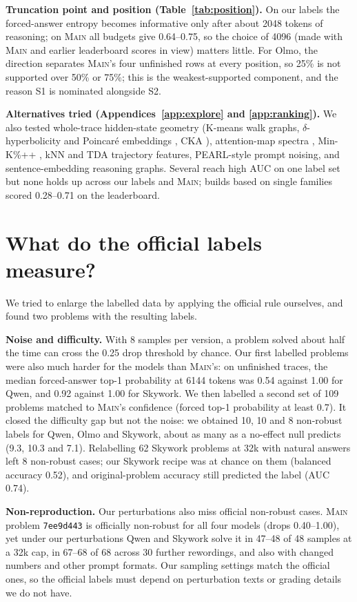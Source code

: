 \documentclass{article}
\newcommand{\sone}{\textsc{S1}}
\newcommand{\stwo}{\textsc{S2}}
\begin{document}
\textbf{Truncation point and position (Table~\ref{tab:position}).} On our labels the forced-answer entropy becomes informative only after about 2048 tokens of reasoning; on \textsc{Main} all budgets give 0.64--0.75, so the choice of 4096 (made with \textsc{Main} and earlier leaderboard scores in view) matters little. For Olmo, the direction separates \textsc{Main}'s four unfinished rows at every position, so 25\% is not supported over 50\% or 75\%; this is the weakest-supported component, and the reason \sone{} is nominated alongside \stwo{}.

\textbf{Alternatives tried (Appendices~\ref{app:explore} and \ref{app:ranking}).} We also tested whole-trace hidden-state geometry (K-means walk graphs, $\delta$-hyperbolicity and Poincar\'e embeddings \citep{raj2026hyperbolic}, CKA \citep{kornblith2019cka}), attention-map spectra \citep{binkowski2025lapeig}, Min-K\%++ \citep{zhang2025minkpp}, kNN and TDA trajectory features, PEARL-style prompt noising, and sentence-embedding reasoning graphs. Several reach high AUC on one label set but none holds up across our labels and \textsc{Main}; builds based on single families scored 0.28--0.71 on the leaderboard.

\section{What do the official labels measure?}
\label{sec:labels}
We tried to enlarge the labelled data by applying the official rule ourselves, and found two problems with the resulting labels.

\textbf{Noise and difficulty.} With 8 samples per version, a problem solved about half the time can cross the 0.25 drop threshold by chance. Our first labelled problems were also much harder for the models than \textsc{Main}'s: on unfinished traces, the median forced-answer top-1 probability at 6144 tokens was 0.54 against 1.00 for Qwen, and 0.92 against 1.00 for Skywork. We then labelled a second set of 109 problems matched to \textsc{Main}'s confidence (forced top-1 probability at least 0.7). It closed the difficulty gap but not the noise: we obtained 10, 10 and 8 non-robust labels for Qwen, Olmo and Skywork, about as many as a no-effect null predicts (9.3, 10.3 and 7.1). Relabelling 62 Skywork problems at 32k with natural answers left 8 non-robust cases; our Skywork recipe was at chance on them (balanced accuracy 0.52), and original-problem accuracy still predicted the label (AUC 0.74).

\textbf{Non-reproduction.} Our perturbations also miss official non-robust cases. \textsc{Main} problem \texttt{7ee9d443} is officially non-robust for all four models (drops 0.40--1.00), yet under our perturbations Qwen and Skywork solve it in 47--48 of 48 samples at a 32k cap, in 67--68 of 68 across 30 further rewordings, and also with changed numbers and other prompt formats. Our sampling settings match the official ones, so the official labels must depend on perturbation texts or grading details we do not have.
\end{document}

